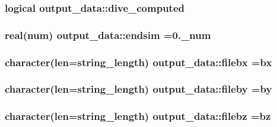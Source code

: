 \subsubsection[{\texorpdfstring{dive\+\_\+computed}{dive_computed}}]{\setlength{\rightskip}{0pt plus 5cm}logical output\+\_\+data\+::dive\+\_\+computed}\hypertarget{namespaceoutput__data_abc6cc1ed098892996b0f0dd858e410d1}{}\label{namespaceoutput__data_abc6cc1ed098892996b0f0dd858e410d1}
\subsubsection[{\texorpdfstring{endsim}{endsim}}]{\setlength{\rightskip}{0pt plus 5cm}real(num) output\+\_\+data\+::endsim =0.\+\_\+num}\hypertarget{namespaceoutput__data_a1ed464801538daa68f0f138d06be9c8a}{}\label{namespaceoutput__data_a1ed464801538daa68f0f138d06be9c8a}
\subsubsection[{\texorpdfstring{filebx}{filebx}}]{\setlength{\rightskip}{0pt plus 5cm}character(len=string\+\_\+length) output\+\_\+data\+::filebx =\textquotesingle{}bx\textquotesingle{}}\hypertarget{namespaceoutput__data_ac0a6ec606c33d1bc037b5ce85a9f4b3a}{}\label{namespaceoutput__data_ac0a6ec606c33d1bc037b5ce85a9f4b3a}
\subsubsection[{\texorpdfstring{fileby}{fileby}}]{\setlength{\rightskip}{0pt plus 5cm}character(len=string\+\_\+length) output\+\_\+data\+::fileby =\textquotesingle{}by\textquotesingle{}}\hypertarget{namespaceoutput__data_ac6e874f0a8121e42bed35e449a4a7c38}{}\label{namespaceoutput__data_ac6e874f0a8121e42bed35e449a4a7c38}
\subsubsection[{\texorpdfstring{filebz}{filebz}}]{\setlength{\rightskip}{0pt plus 5cm}character(len=string\+\_\+length) output\+\_\+data\+::filebz =\textquotesingle{}bz\textquotesingle{}}\hypertarget{namespaceoutput__data_a07a77b208c10f32c5723378f16ea4301}{}\label{namespaceoutput__data_a07a77b208c10f32c5723378f16ea4301}
